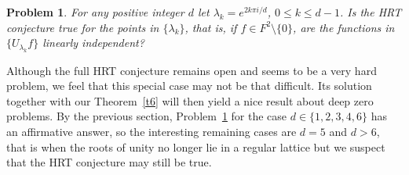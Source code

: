\documentclass[reqno,11pt]{amsart}
\newtheorem{problem}[theorem]{Problem}
\begin{document}
\begin{problem}\label{p8}
For any positive integer $d$ let $\lambda_k=e^{2k\pi i/d}$, $0\le k\le d-1$.
Is the HRT conjecture true for the points in $\{\lambda_k\}$, that is, if
$f\in F^2\setminus\{0\}$, are the functions in $\{U_{\lambda_k}f\}$ 
linearly independent?
\end{problem}

Although the full HRT conjecture remains open and seems to be a very
hard problem, we feel that this special case may not be that difficult. 
Its solution together with our Theorem~\ref{t6} will then yield a nice
result about deep zero problems. By the previous section, 
Problem~\ref{p8} for the case $d\in\{1,2,3,4,6\}$ has an affirmative 
answer, so the interesting remaining cases are $d=5$ and $d>6$, 
that is when the roots of unity no longer lie in a regular lattice but 
we suspect that the HRT conjecture may still be true.
\end{document}
